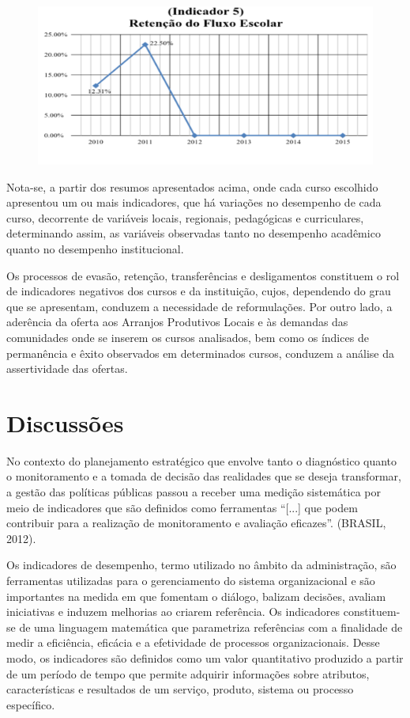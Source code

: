 \documentclass[article,12pt,onesidea,4paper,english,brazil]{abntex2}
\begin{document}
	\begin{figure}[ht]
		\centering
		\includegraphics[width=0.7\linewidth]{PIP-97-5}
	\end{figure}
	
	Nota-se, a partir dos resumos apresentados acima, onde cada curso escolhido apresentou um
	ou mais indicadores, que há variações no desempenho de cada curso, decorrente de variáveis
	locais, regionais, pedagógicas e curriculares, determinando assim, as variáveis observadas tanto no desempenho acadêmico quanto no desempenho institucional.
	
	Os processos de evasão, retenção, transferências e desligamentos constituem o rol de
	indicadores negativos dos cursos e da instituição, cujos, dependendo do grau que se apresentam,
	conduzem a necessidade de reformulações. Por outro lado, a aderência da oferta aos Arranjos
	Produtivos Locais e às demandas das comunidades onde se inserem os cursos analisados, bem
	como os índices de permanência e êxito observados em determinados cursos, conduzem a análise
	da assertividade das ofertas.
	
	\section*{Discussões}
	No contexto do planejamento estratégico que envolve tanto o diagnóstico quanto o
	monitoramento e a tomada de decisão das realidades que se deseja transformar, a gestão das
	políticas públicas passou a receber uma medição sistemática por meio de indicadores que são
	definidos como ferramentas “[...] que podem contribuir para a realização de monitoramento e
	avaliação eficazes”. (BRASIL, 2012).
	
	Os indicadores de desempenho, termo utilizado no âmbito da administração, são
	ferramentas utilizadas para o gerenciamento do sistema organizacional e são importantes na
	medida em que fomentam o diálogo, balizam decisões, avaliam iniciativas e induzem melhorias
	ao criarem referência. Os indicadores constituem-se de uma linguagem matemática que
	parametriza referências com a finalidade de medir a eficiência, eficácia e a efetividade de
	processos organizacionais. Desse modo, os indicadores são definidos como um valor quantitativo
	produzido a partir de um período de tempo que permite adquirir informações sobre atributos,
	características e resultados de um serviço, produto, sistema ou processo específico.
	
\end{document}
